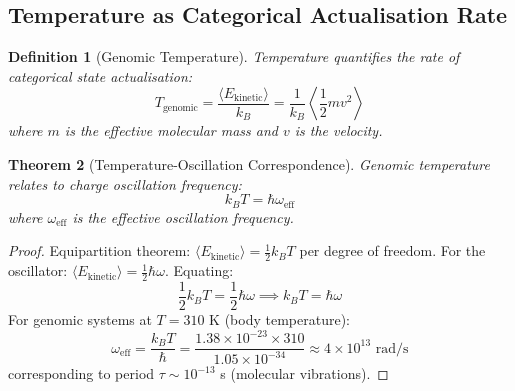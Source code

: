 \documentclass[11pt,a4paper]{article}
\newtheorem{theorem}{Theorem}[section]
\newtheorem{definition}[theorem]{Definition}
\theoremstyle{remark}
\begin{document}
\subsection{Temperature as Categorical Actualisation Rate}

\begin{definition}[Genomic Temperature]
\label{def:genomic_temperature}
Temperature quantifies the rate of categorical state actualisation:
\begin{equation}
T_{\text{genomic}} = \frac{\langle E_{\text{kinetic}}\rangle}{k_B} = \frac{1}{k_B}\left\langle\frac{1}{2}m v^2\right\rangle
\end{equation}
where $m$ is the effective molecular mass and $v$ is the velocity.
\end{definition}

\begin{theorem}[Temperature-Oscillation Correspondence]
\label{thm:temp_oscillation}
Genomic temperature relates to charge oscillation frequency:
\begin{equation}
k_BT = \hbar\omega_{\text{eff}}
\end{equation}
where $\omega_{\text{eff}}$ is the effective oscillation frequency.
\end{theorem}

\begin{proof}
Equipartition theorem: $\langle E_{\text{kinetic}}\rangle = \frac{1}{2}k_BT$ per degree of freedom. For the oscillator: $\langle E_{\text{kinetic}}\rangle = \frac{1}{2}\hbar\omega$. Equating:
\begin{equation}
\frac{1}{2}k_BT = \frac{1}{2}\hbar\omega \implies k_BT = \hbar\omega
\end{equation}
For genomic systems at $T = 310$ K (body temperature):
\begin{equation}
\omega_{\text{eff}} = \frac{k_BT}{\hbar} = \frac{1.38 \times 10^{-23} \times 310}{1.05 \times 10^{-34}} \approx 4 \times 10^{13} \text{ rad/s}
\end{equation}
corresponding to period $\tau \sim 10^{-13}$ s (molecular vibrations).
\end{proof}
\end{document}
